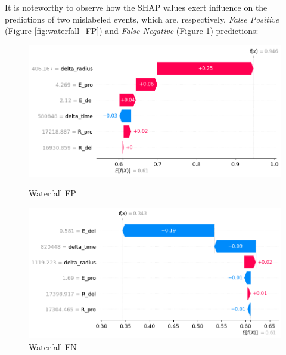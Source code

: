 It is noteworthy to observe how the SHAP values exert influence on the predictions of two mislabeled events, which are, respectively, \textit{False Positive} (Figure \ref{fig:waterfall_FP}) and \textit{False Negative} (Figure \ref{fig:waterfall_FN}) predictions:


\begin{figure}[h!]
	\centering
	\begin{minipage}{0.5\textwidth}
		\centering
		\includegraphics[width=\linewidth]{Images/Shap/waterfall_FP}
		\caption{Waterfall FP}
		\label{fig:waterfall_FP}
	\end{minipage}%
	\begin{minipage}{0.5\textwidth}
		\centering
		\includegraphics[width=\linewidth]{Images/Shap/waterfall_TN}
		\caption{Waterfall FN}
		\label{fig:waterfall_FN}
	\end{minipage}
\end{figure}



